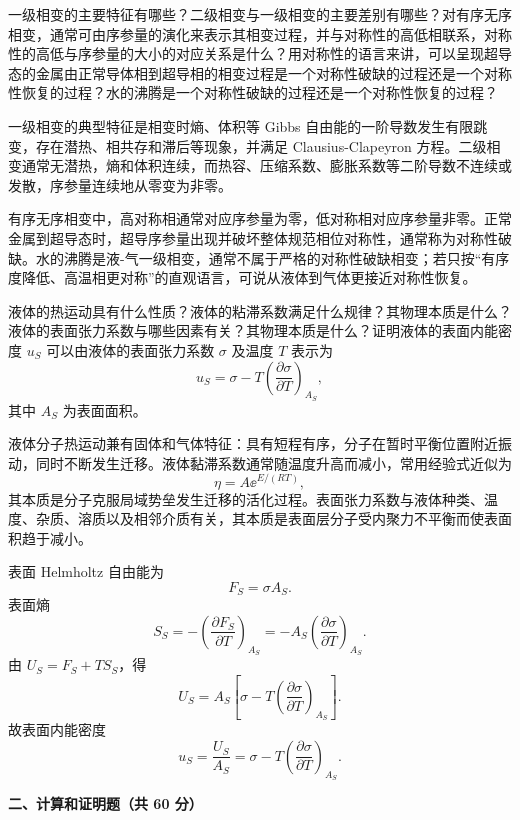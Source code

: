 \begin{question}
一级相变的主要特征有哪些？二级相变与一级相变的主要差别有哪些？对有序无序相变，通常可由序参量的演化来表示其相变过程，并与对称性的高低相联系，对称性的高低与序参量的大小的对应关系是什么？用对称性的语言来讲，可以呈现超导态的金属由正常导体相到超导相的相变过程是一个对称性破缺的过程还是一个对称性恢复的过程？水的沸腾是一个对称性破缺的过程还是一个对称性恢复的过程？
\begin{solution}
一级相变的典型特征是相变时熵、体积等 Gibbs 自由能的一阶导数发生有限跳变，存在潜热、相共存和滞后等现象，并满足 Clausius-Clapeyron 方程。二级相变通常无潜热，熵和体积连续，而热容、压缩系数、膨胀系数等二阶导数不连续或发散，序参量连续地从零变为非零。

有序无序相变中，高对称相通常对应序参量为零，低对称相对应序参量非零。正常金属到超导态时，超导序参量出现并破坏整体规范相位对称性，通常称为对称性破缺。水的沸腾是液-气一级相变，通常不属于严格的对称性破缺相变；若只按“有序度降低、高温相更对称”的直观语言，可说从液体到气体更接近对称性恢复。
\end{solution}
\end{question}

\begin{question}
液体的热运动具有什么性质？液体的粘滞系数满足什么规律？其物理本质是什么？液体的表面张力系数与哪些因素有关？其物理本质是什么？证明液体的表面内能密度 $u_S$ 可以由液体的表面张力系数 $\sigma$ 及温度 $T$ 表示为
\[
u_S=\sigma-T\left(\frac{\partial\sigma}{\partial T}\right)_{A_S},
\]
其中 $A_S$ 为表面面积。
\begin{solution}
液体分子热运动兼有固体和气体特征：具有短程有序，分子在暂时平衡位置附近振动，同时不断发生迁移。液体黏滞系数通常随温度升高而减小，常用经验式近似为
\[
\eta=A\ee^{E/(RT)},
\]
其本质是分子克服局域势垒发生迁移的活化过程。表面张力系数与液体种类、温度、杂质、溶质以及相邻介质有关，其本质是表面层分子受内聚力不平衡而使表面积趋于减小。

表面 Helmholtz 自由能为
\[
F_S=\sigma A_S.
\]
表面熵
\[
S_S=-\left(\frac{\partial F_S}{\partial T}\right)_{A_S}
=-A_S\left(\frac{\partial\sigma}{\partial T}\right)_{A_S}.
\]
由 $U_S=F_S+TS_S$，得
\[
U_S=A_S\left[\sigma-T\left(\frac{\partial\sigma}{\partial T}\right)_{A_S}\right].
\]
故表面内能密度
\[
u_S=\frac{U_S}{A_S}=\sigma-T\left(\frac{\partial\sigma}{\partial T}\right)_{A_S}.
\]
\end{solution}
\end{question}

\textbf{二、计算和证明题（共 60 分）}

